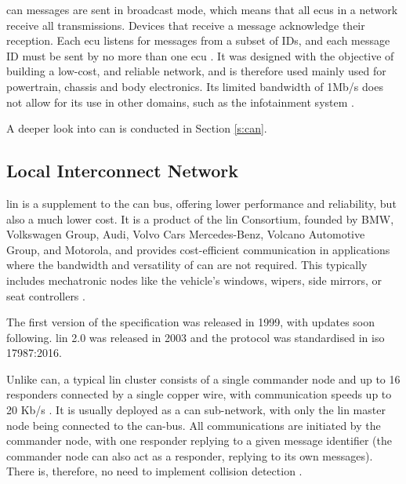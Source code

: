 \gls{can} messages are sent in broadcast mode, which means that all \glspl{ecu} in a network receive all transmissions. Devices that receive a message acknowledge their reception. Each \gls{ecu} listens for messages from a subset of IDs, and each message ID must be sent by no more than one \gls{ecu} \citep{kulandaivel2019canvas}. It was designed with the objective of building a low-cost, and reliable network, and is therefore used mainly used for powertrain, chassis and body electronics. Its limited bandwidth of 1Mb/s does not allow for its use in other domains, such as the infotainment system \citep{Huang2019}.\par

A deeper look into \gls{can} is conducted in Section \ref{s:can}.

\subsection{Local Interconnect Network}

\gls{lin} is a supplement to the \gls{can} bus, offering lower performance and reliability, but also a much lower cost. It is a product of the \gls{lin} Consortium, founded by BMW, Volkswagen Group, Audi, Volvo Cars Mercedes-Benz, Volcano Automotive Group, and Motorola, and provides cost-efficient communication in applications where the bandwidth and versatility of \gls{can} are not required. This typically includes mechatronic nodes like the vehicle's windows, wipers, side mirrors, or seat controllers \citep{LIN}.\par

The first version of the specification was released in 1999, with updates soon following. \gls{lin} 2.0 was released in 2003 and the protocol was standardised in \gls{iso} 17987:2016.\par

Unlike \gls{can}, a typical \gls{lin} cluster consists of a single commander node and up to 16 responders connected by a single copper wire, with communication speeds up to 20 Kb/s \citep{Takahashi2017}. It is usually deployed as a \gls{can} sub-network, with only the \gls{lin} master node being connected to the \gls{can}-bus. All communications are initiated by the commander node, with one responder replying to a given message identifier (the commander node can also act as a responder, replying to its own messages). There is, therefore, no need to implement collision detection \citep{LIN_CSS}.\par

